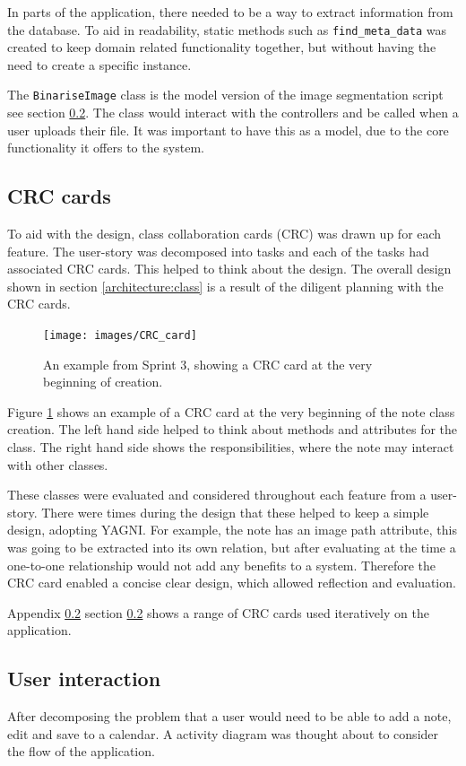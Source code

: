 In parts of the application, there needed to be a way to extract information from the database. To aid in readability, static methods such as \texttt{find_meta_data} was created to keep domain related functionality together, but without having the need to create a specific instance.

The \texttt{BinariseImage} class is the model version of the image segmentation script see section \ref{}. The class would interact with the controllers and be called when a user uploads their file. It was important to have this as a model, due to the core functionality it offers to the system.

\subsection{CRC cards}
To aid with the design, class collaboration cards (CRC) was drawn up for each feature. The user-story was decomposed into tasks and each of the tasks had associated CRC cards. This helped to think about the design.  The overall design shown in section \ref{architecture:class} is a result of the diligent planning with the CRC cards.

\begin{figure}[h]
  \centering
  \texttt{[image: images/CRC\_card]}
  \caption{An example from Sprint 3, showing a CRC card at the very beginning of creation.}
  \label{fig:crc1}
\end{figure}

Figure \ref{fig:crc1} shows an example of a CRC card at the very beginning of the note class creation. The left hand side helped to think about methods and attributes for the class. The right hand side shows the responsibilities, where the note may interact with other classes.

These classes were evaluated and considered throughout each feature from a user-story. There were times during the design that these helped to keep a simple design, adopting YAGNI. For example, the note has an image path attribute, this was going to be extracted into its own relation, but after evaluating at the time a one-to-one relationship would not add any benefits to a system. Therefore the CRC card enabled a concise clear design, which allowed reflection and evaluation.

Appendix \ref{} section \ref{} shows a range of CRC cards used iteratively on the application.


\subsection{User interaction}
After decomposing the problem that a user would need to be able to add a note, edit and save to a calendar. A activity diagram was thought about to consider the flow of the application.

